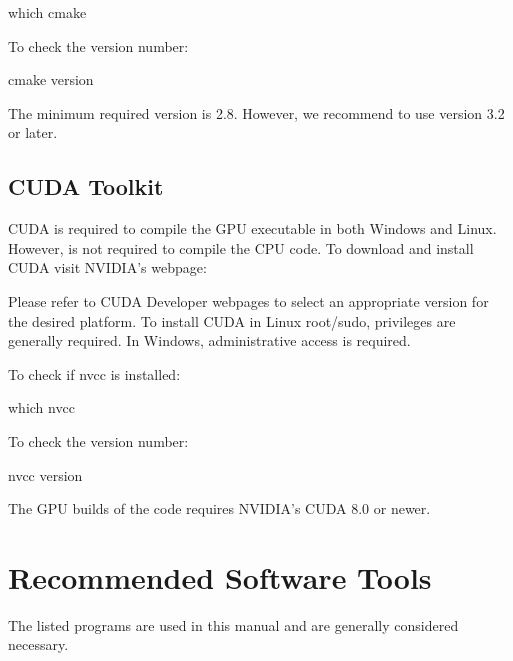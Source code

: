 \documentclass[letterpaper,10pt,english]{sphinxmanual}
\begin{document}
%
\begin{sphinxVerbatim}[commandchars=\\\{\}]
\PYGZdl{} which cmake
\end{sphinxVerbatim}

To check the version number:

%
\begin{sphinxVerbatim}[commandchars=\\\{\}]
\PYGZdl{} cmake \PYGZhy{}\PYGZhy{}version
\end{sphinxVerbatim}

The minimum required version is 2.8. However, we recommend to use version 3.2 or later.


\section{CUDA Toolkit}
\label{\detokenize{software_requirements:cuda-toolkit}}
CUDA is required to compile the GPU executable in both Windows and Linux. However, is not required to compile the CPU code. To download and install CUDA visit NVIDIA’s webpage:



Please refer to CUDA Developer webpages to select an appropriate version for the desired platform. To install CUDA in Linux root/sudo, privileges are generally required. In Windows, administrative access is required.

To check if nvcc is installed:

%
\begin{sphinxVerbatim}[commandchars=\\\{\}]
\PYGZdl{} which nvcc
\end{sphinxVerbatim}

To check the version number:

%
\begin{sphinxVerbatim}[commandchars=\\\{\}]
\PYGZdl{} nvcc \PYGZhy{}\PYGZhy{}version
\end{sphinxVerbatim}

The GPU builds of the code requires NVIDIA’s CUDA 8.0 or newer.


\chapter{Recommended Software Tools}
\label{\detokenize{software_tools:recommended-software-tools}}\label{\detokenize{software_tools::doc}}
The listed programs are used in this manual and are generally considered necessary.
\end{document}
